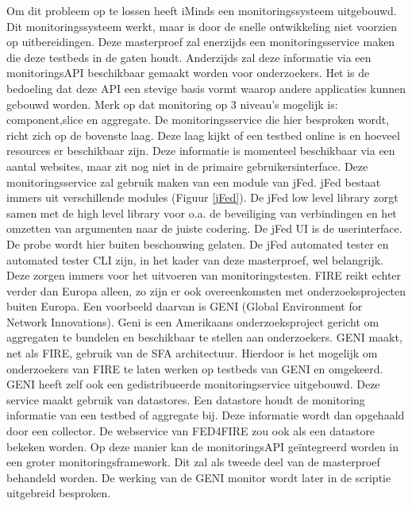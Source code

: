 \npar
Om dit probleem op te lossen heeft iMinds een monitoringssysteem uitgebouwd\citep{fed4fire-second-fed-arch}. Dit monitoringssysteem werkt, maar is door de snelle ontwikkeling niet voorzien op uitbereidingen. Deze masterproef zal enerzijds een monitoringsservice maken die deze testbeds in de gaten houdt. Anderzijds zal deze informatie via een monitoringsAPI beschikbaar gemaakt worden voor onderzoekers. Het is de bedoeling dat deze API een stevige basis vormt waarop andere applicaties kunnen gebouwd worden. Merk op dat monitoring op 3 niveau's mogelijk is: component,slice en aggregate. De monitoringsservice die hier besproken wordt, richt zich op de bovenste laag. Deze laag kijkt of een testbed online is en hoeveel resources er beschikbaar zijn. Deze informatie is momenteel beschikbaar via een aantal websites, maar zit nog niet in de primaire gebruikersinterface.
\npar
Deze monitoringsservice zal gebruik maken van een module van jFed.
jFed bestaat immers uit verschillende modules (Figuur \ref{jFed}).
De jFed low level library zorgt samen met de high level library voor o.a. de beveiliging van verbindingen en het omzetten van argumenten naar de juiste codering. De jFed UI is de userinterface. De probe wordt hier buiten beschouwing gelaten. De jFed automated tester en automated tester CLI zijn, in het kader van deze masterproef, wel belangrijk. Deze zorgen immers voor het uitvoeren van monitoringstesten.
\clearpage
\npar
FIRE reikt echter verder dan Europa alleen, zo zijn er ook overeenkomsten met onderzoeksprojecten buiten Europa. Een voorbeeld daarvan is GENI (Global Environment for Network Innovations). Geni is een Amerikaans onderzoeksproject gericht om aggregaten te bundelen en beschikbaar te stellen aan onderzoekers\citep{geni-what-is}. GENI maakt, net als FIRE, gebruik van de SFA architectuur\citep{geni-sfa}. Hierdoor is het mogelijk om onderzoekers van FIRE te laten werken op testbeds van GENI en omgekeerd.
\npar
GENI heeft zelf ook een gedistribueerde monitoringservice uitgebouwd\citep{geni-monitor}. Deze service maakt gebruik van datastores\citep{geni-overview}. Een datastore houdt de monitoring informatie van een testbed of aggregate bij. Deze informatie wordt dan opgehaald door een collector. De webservice van FED4FIRE zou ook als een datastore bekeken worden. Op deze manier kan de monitoringsAPI geïntegreerd worden in een groter monitoringsframework. Dit zal als tweede deel van de masterproef behandeld worden. De werking van de GENI monitor wordt later in de scriptie uitgebreid besproken.